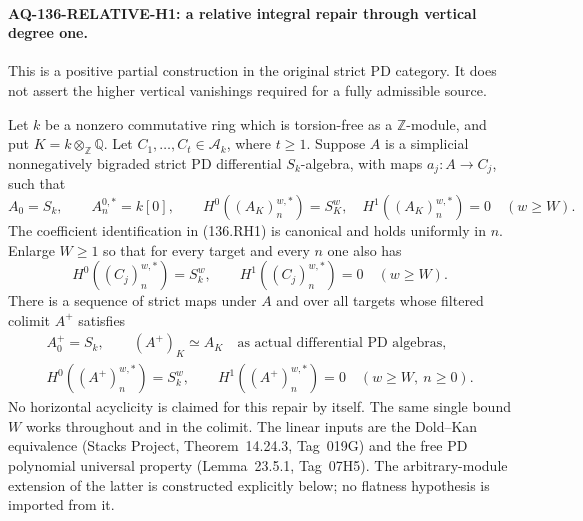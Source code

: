 \paragraph{AQ-136-RELATIVE-H1: a relative integral repair through vertical degree one.}
This is a positive partial construction in the original strict PD
category. It does not assert the higher vertical vanishings required
for a fully admissible source.

Let $k$ be a nonzero commutative ring which is torsion-free as a
$\mathbb Z$-module, and put $K=k\otimes_{\mathbb Z}\mathbb Q$.
Let $C_1,\ldots,C_t\in\mathcal A_k$, where $t\ge1$.
Suppose $A$ is a simplicial nonnegatively bigraded strict PD
differential $S_k$-algebra, with maps $a_j:A\to C_j$, such that
\[
 A_0=S_k,\qquad A_n^{0,*}=k[0],\qquad
 H^0((A_K)_n^{w,*})=S_K^w,\quad
 H^1((A_K)_n^{w,*})=0\quad(w\ge W).                       \tag{136.RH1}
\]
The coefficient identification in (136.RH1) is canonical and
holds uniformly in $n$. Enlarge $W\ge1$ so that for every target
and every $n$ one also has
\[
 H^0((C_j)_n^{w,*})=S_k^w,
       \qquad H^1((C_j)_n^{w,*})=0\quad(w\ge W).           \tag{136.RH2}
\]
There is a sequence of strict maps under $A$ and over all targets
whose filtered colimit $A^+$ satisfies
\[
 \begin{gathered}
 A^+_0=S_k,\qquad (A^+)_K\simeq A_K
                   \quad\text{as actual differential PD algebras},\\
 H^0((A^+)_n^{w,*})=S_k^w,\qquad
 H^1((A^+)_n^{w,*})=0\quad(w\ge W,\ n\ge0).
 \end{gathered}                                             \tag{136.RH3}
\]
No horizontal acyclicity is claimed for this repair by itself.
The same single bound $W$ works throughout and in the colimit.
The linear inputs are the Dold--Kan equivalence
(Stacks Project, Theorem~14.24.3, Tag~019G) and the free PD
polynomial universal property (Lemma~23.5.1, Tag~07H5).
The arbitrary-module extension of the latter is constructed
explicitly below; no flatness hypothesis is imported from it.

